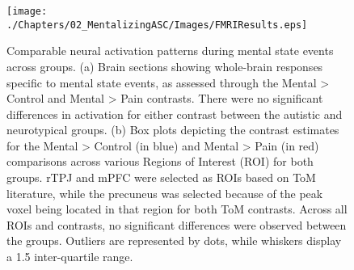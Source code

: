 \begin{figure}[!ht]
	\centering
    \texttt{[image: ./Chapters/02\_MentalizingASC/Images/FMRIResults.eps]}
	\caption{Comparable neural activation patterns during mental state events across groups. (a) Brain sections showing whole-brain responses specific to mental state events, as assessed through the Mental > Control and Mental > Pain contrasts. There were no significant differences in activation for either contrast between the autistic and neurotypical groups. (b) Box plots depicting the contrast estimates for the Mental > Control (in blue) and Mental > Pain (in red) comparisons across various Regions of Interest (ROI) for both groups. rTPJ and mPFC were selected as ROIs based on ToM literature, while the precuneus was selected because of the peak voxel being located in that region for both ToM contrasts. Across all ROIs and contrasts, no significant differences were observed between the groups. Outliers are represented by dots, while whiskers display a 1.5 inter-quartile range.}
    \vspace*{-10pt}
	\label{fig:fmri-results}
\end{figure}



